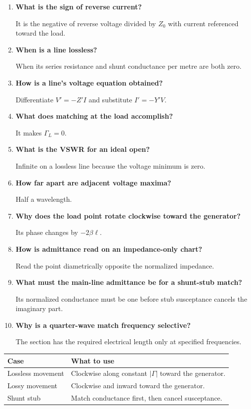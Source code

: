 \documentclass[12pt,a4paper]{article}
\newcommand{\Q}[1]{\textbf{#1}\par\noindent\ignorespaces}
\begin{document}
\begin{tcolorbox}[exambox,title={Frequently Asked / Viva Questions}]
\begin{enumerate}[topsep=0pt, label=\textbf{Q\arabic*.}, itemsep=5pt]
\item \Q{What is the sign of reverse current?}
It is the negative of reverse voltage divided by $Z_0$ with current referenced toward the load.
\item \Q{When is a line lossless?}
When its series resistance and shunt conductance per metre are both zero.
\item \Q{How is a line's voltage equation obtained?}
Differentiate $V'=-Z'I$ and substitute $I'=-Y'V$.
\item \Q{What does matching at the load accomplish?}
It makes $\Gamma_L=0$.
\item \Q{What is the VSWR for an ideal open?}
Infinite on a lossless line because the voltage minimum is zero.
\item \Q{How far apart are adjacent voltage maxima?}
Half a wavelength.
\item \Q{Why does the load point rotate clockwise toward the generator?}
Its phase changes by $-2\beta\ell$.
\item \Q{How is admittance read on an impedance-only chart?}
Read the point diametrically opposite the normalized impedance.
\item \Q{What must the main-line admittance be for a shunt-stub match?}
Its normalized conductance must be one before stub susceptance cancels the imaginary part.
\item \Q{Why is a quarter-wave match frequency selective?}
The section has the required electrical length only at specified frequencies.
\end{enumerate}
\end{tcolorbox}
\begin{tcolorbox}[tikzbox,title={Summary comparison}]
\begin{tabularx}{\linewidth}{|B{4cm}|Y|}\hline
\textbf{Case} & \textbf{What to use} \\ \hline
Lossless movement & Clockwise along constant $|\Gamma|$ toward the generator. \\ \hline
Lossy movement & Clockwise and inward toward the generator. \\ \hline
Shunt stub & Match conductance first, then cancel susceptance. \\ \hline
\end{tabularx}
\end{tcolorbox}
\end{document}
